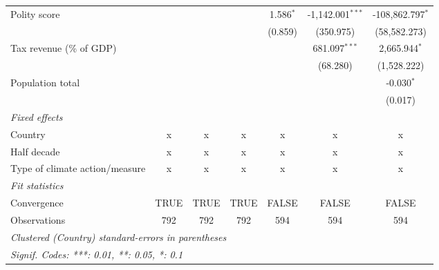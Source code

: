 \begin{tabular}{lcccccc}
   Polity score                                            &         &                &                & 1.586$^{*}$    & -1,142.001$^{***}$ & -108,862.797$^{*}$\\   
                                                           &         &                &                & (0.859)        & (350.975)          & (58,582.273)\\   
   Tax revenue (\% of GDP)                                 &         &                &                &                & 681.097$^{***}$    & 2,665.944$^{*}$\\   
                                                           &         &                &                &                & (68.280)           & (1,528.222)\\   
   Population total                                        &         &                &                &                &                    & -0.030$^{*}$\\   
                                                           &         &                &                &                &                    & (0.017)\\   
   \emph{Fixed effects}\\
   Country                                                 & x       & x              & x              & x              & x                  & x\\  
   Half decade                                             & x       & x              & x              & x              & x                  & x\\  
   Type of climate action/measure                          & x       & x              & x              & x              & x                  & x\\  
   \midrule \emph{Fit statistics}\\
   Convergence                                             &TRUE     & TRUE           & TRUE           & FALSE          & FALSE              & FALSE\\  
   Observations                                            & 792     & 792            & 792            & 594            & 594                & 594\\  
   \midrule
   \multicolumn{7}{l}{\emph{Clustered (Country) standard-errors in parentheses}}\\
   \multicolumn{7}{l}{\emph{Signif. Codes: ***: 0.01, **: 0.05, *: 0.1}}\\
\end{tabular}
\par\endgroup


